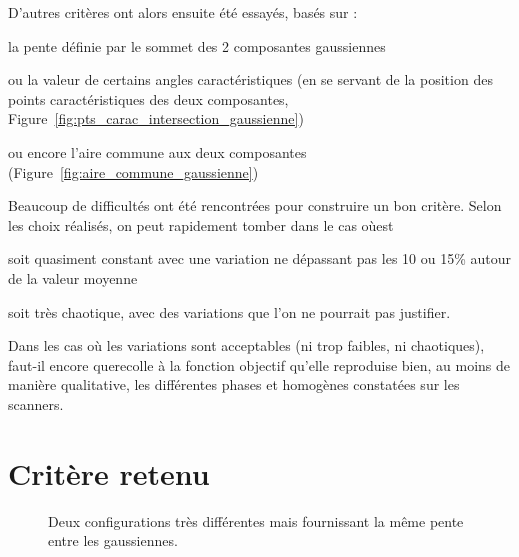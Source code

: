 \documentclass[main.tex]{subfiles}
\begin{document}
D'autres critères ont alors ensuite été essayés, basés sur :
\begin{myitemize}
\item la pente définie par le sommet des 2 composantes gaussiennes
\item ou la valeur de certains angles caractéristiques (en se servant de la position des points caractéristiques des deux composantes, \cf Figure~\ref{fig:pts_carac_intersection_gaussienne})
\item ou encore l'aire commune aux deux composantes (\cf Figure~\ref{fig:aire_commune_gaussienne})
\end{myitemize}
Beaucoup de difficultés ont été rencontrées pour construire un bon critère. Selon les choix réalisés, on peut rapidement tomber dans le cas où\HH est 
\begin{myitemize}
\item soit quasiment constant avec une variation ne dépassant pas les 10 ou 15\% autour de la valeur moyenne
\item soit très chaotique, avec des variations que l'on ne pourrait pas justifier.
\end{myitemize}
Dans les cas où les variations sont acceptables (ni trop faibles, ni chaotiques), faut-il encore que\HH recolle à la fonction objectif \ie qu'elle reproduise bien, au moins de manière qualitative, les différentes phases \heterogenes et homogènes constatées sur les scanners. %


\section{Critère retenu}
\begin{figure}
\centering
{}
\caption{\label{fig:pente_gaussienne_identique}Deux configurations très différentes mais fournissant la même pente entre les gaussiennes.}
\end{figure}
\end{document}

